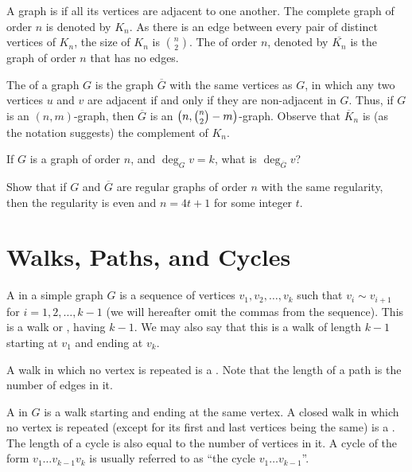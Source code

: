 A graph is  if all its vertices are adjacent to one another. The complete graph of order $n$ is denoted by $K_n$. As there is an edge between every pair of distinct vertices of $K_n$, the size of $K_n$ is $\binom n 2$. The  of order $n$, denoted by $\overline{K_n}$ is the graph of order $n$ that has no edges.

The  of a graph $G$ is the graph $\overline G$ with the same vertices as $G$, in which any two vertices $u$ and $v$ are adjacent if and only if they are non-adjacent in $G$. Thus, if $G$ is an $(n, m)$-graph, then $\overline G$ is an $\pqty{n, \binom n 2 - m}$-graph. Observe that $\overline K_n$ is (as the notation suggests) the complement of $K_n$.

\begin{Exercise}
If $G$ is a graph of order $n$, and $\deg_G v = k$, what is $\deg_{\overline G} v$?
\end{Exercise}

\begin{Exercise}
Show that if $G$ and $\overline G$ are regular graphs of order $n$ with the same regularity, then the regularity is even and $n = 4t + 1$ for some integer $t$.
\end{Exercise}


\section{Walks, Paths, and Cycles}\label{sec:Walks}

A  in a simple graph $G$ is a sequence of vertices $v_1, v_2, \ldots, v_k$ such that $v_i \sim v_{i + 1}$ for $i = 1, 2, \ldots, k - 1$ (we will hereafter omit the commas from the sequence). This is a walk  or , having  $k - 1$. We may also say that this is a walk of length $k - 1$ starting at $v_1$ and ending at $v_k$.

A walk in which no vertex is repeated is a . Note that the length of a path is the number of edges in it.

A  in $G$ is a walk starting and ending at the same vertex. A closed walk in which no vertex is repeated (except for its first and last vertices being the same) is a . The length of a cycle is also equal to the number of vertices in it. A cycle of the form $v_1 \ldots v_{k-1} v_k$ is usually referred to as ``the cycle $v_1 \ldots v_{k-1}$''.

